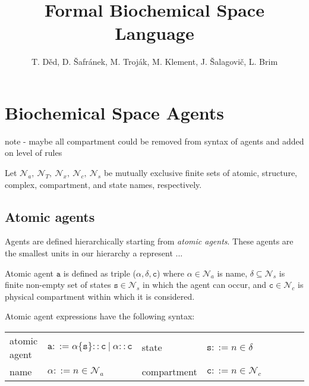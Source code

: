 \documentclass{entcs}
\renewcommand{\~}[0]{\texttildelow}
\newcommand{\choice}{|}
\begin{document}
\begin{frontmatter}
\title{Formal Biochemical Space Language}

\author{\normalsize
T. D\v{e}d, D. \v{S}afr\'anek, M. Troj\'ak, M. Klement, J. \v{S}alagovi\v{c}, L. Brim}
\address{Faculty of Informatics, Masaryk University\\
Brno, Czech Republic
}

\end{frontmatter}

\section{Biochemical Space Agents}

note - maybe all compartment could be removed from syntax of agents and added on level of rules

Let $\mathcal{N}_{a},~\mathcal{N}_{T},~\mathcal{N}_{x},~\mathcal{N}_{c},~\mathcal{N}_{s}$ be mutually exclusive finite sets of atomic, structure, complex, compartment, and state names, respectively. 

\subsection{Atomic agents}

Agents are defined hierarchically starting from \emph{atomic agents}. These agents are the smallest units in our hierarchy a represent ...

\begin{definition}
Atomic agent $\mathtt{a}$ is defined as triple ($\alpha, \delta, \mathtt{c}$) where $\alpha \in \mathcal{N}_{a}$ is name, $\delta \subseteq \mathcal{N}_{s}$ is finite non-empty set of states $\mathtt{s} \in \mathcal{N}_{s}$ in which the agent can occur, and $\mathtt{c} \in \mathcal{N}_{c}$ is physical compartment within which it is considered.
\end{definition}

Atomic agent expressions have the following syntax:

\begin{center}
{\small
\hspace*{-1cm}\begin{tabular}{ ll ll ll ll }
 atomic agent & $\mathtt{a} ::= \alpha\{\mathtt{s}\}::\mathtt{c}~\choice~\alpha::\mathtt{c}$ & state & $\mathtt{s} ::= n \in \delta$\\
 name & $\alpha ::= n \in \mathcal{N}_{a}$ & compartment & $\mathtt{c} ::= n \in \mathcal{N}_{c}$\\
\end{tabular}
}
\end{center}
\end{document}
